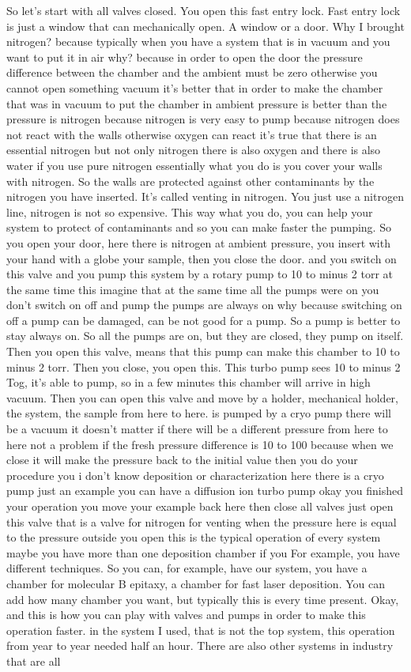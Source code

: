 So let's start with all valves closed. You open this fast entry lock. Fast entry lock is just a window that can mechanically open. A window or a door. Why I brought nitrogen? because typically when you have a system that is in vacuum and you want to put it in air why? because in order to open the door the pressure difference between the chamber and the ambient must be zero otherwise you cannot open something vacuum it's better that in order to make the chamber that was in vacuum to put the chamber in ambient pressure is better than the pressure is nitrogen because nitrogen is very easy to pump because nitrogen does not react with the walls otherwise oxygen can react it's true that there is an essential nitrogen but not only nitrogen there is also oxygen and there is also water if you use pure nitrogen essentially what you do is you cover your walls with nitrogen. So the walls are protected against other contaminants by the nitrogen you have inserted. It's called venting in nitrogen. You just use a nitrogen line, nitrogen is not so expensive. This way what you do, you can help your system to protect of contaminants and so you can make faster the pumping. So you open your door, here there is nitrogen at ambient pressure, you insert with your hand with a globe your sample, then you close the door. and you switch on this valve and you pump this system by a rotary pump to 10 to minus 2 torr at the same time this imagine that at the same time all the pumps were on you don't switch on off and pump the pumps are always on why because switching on off a pump can be damaged, can be not good for a pump. So a pump is better to stay always on. So all the pumps are on, but they are closed, they pump on itself. Then you open this valve, means that this pump can make this chamber to 10 to minus 2 torr. Then you close, you open this. This turbo pump sees 10 to minus 2 Tog, it's able to pump, so in a few minutes this chamber will arrive in high vacuum. Then you can open this valve and move by a holder, mechanical holder, the system, the sample from here to here. is pumped by a cryo pump there will be a vacuum it doesn't matter if there will be a different pressure from here to here not a problem if the fresh pressure difference is 10 to 100 because when we close it will make the pressure back to the initial value then you do your procedure you i don't know deposition or characterization here there is a cryo pump just an example you can have a diffusion ion turbo pump okay you finished your operation you move your example back here then close all valves just open this valve that is a valve for nitrogen for venting when the pressure here is equal to the pressure outside you open this is the typical operation of every system maybe you have more than one deposition chamber if you For example, you have different techniques. So you can, for example, have our system, you have a chamber for molecular B epitaxy, a chamber for fast laser deposition. You can add how many chamber you want, but typically this is every time present. Okay, and this is how you can play with valves and pumps in order to make this operation faster. in the system I used, that is not the top system, this operation from year to year needed half an hour. There are also other systems in industry that are all 